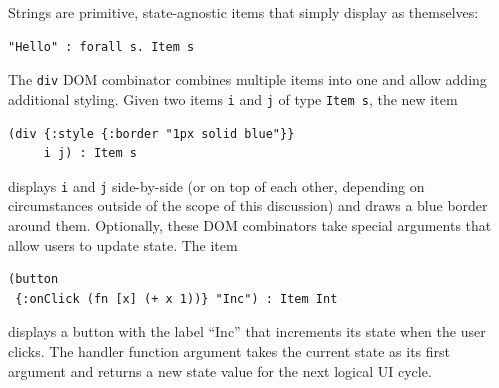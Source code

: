 \documentclass[sigplan,screen]{acmart}
\begin{document}
Strings are primitive, state-agnostic items that simply display as
themselves:
%
\begin{verbatim}
"Hello" : forall s. Item s
\end{verbatim}
%
The \texttt{div} DOM combinator combines multiple items into
one and allow adding additional styling. Given two items \texttt{i}
and \texttt{j} of type \texttt{Item s}, the new item
%
\begin{verbatim}
(div {:style {:border "1px solid blue"}}
     i j) : Item s
\end{verbatim}
%
displays \texttt{i} and \texttt{j}
side-by-side (or on top of each other, depending on circumstances
outside of the scope of this discussion) and draws a blue
border around them. Optionally, these DOM combinators take special
arguments that allow users to update state. The item
%
\begin{verbatim}
(button
 {:onClick (fn [x] (+ x 1))} "Inc") : Item Int
\end{verbatim}
%
displays a button with the label ``Inc'' that increments its state
when the user clicks. The handler function argument takes the current state as its
first argument and returns a new state value for the next logical UI
cycle.
\end{document}
